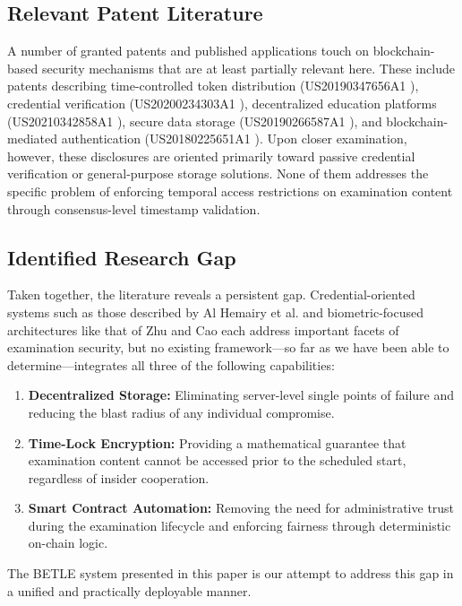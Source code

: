\documentclass[final,5p,times]{elsarticle}
\begin{document}
\subsection{Relevant Patent Literature}
A number of granted patents and published applications touch on blockchain-based security mechanisms that are at least partially relevant here. These include patents describing time-controlled token distribution \newline(US20190347656A1 \cite{us20190347656a1}), credential verification \newline(US20200234303A1 \cite{us20200234303a1}), decentralized education platforms (US20210342858A1 \cite{us20210342858a1}), secure data storage (US20190266587A1 \cite{us20190266587a1}), and blockchain-mediated authentication (US20180225651A1 \cite{us20180225651a1}). Upon closer examination, however, these disclosures are oriented primarily toward passive credential verification or general-purpose storage solutions. None of them addresses the specific problem of enforcing temporal access restrictions on examination content through consensus-level timestamp validation.

\subsection{Identified Research Gap}
Taken together, the literature reveals a persistent gap. Credential-oriented systems such as those described by Al Hemairy et al. \cite{AlHemairy2024} and biometric-focused architectures like that of Zhu and Cao \cite{zhu2021secure} each address important facets of examination security, but no existing framework—so far as we have been able to determine—integrates all three of the following capabilities:
\begin{enumerate}
    \item \textbf{Decentralized Storage:} Eliminating server-level single points of failure and reducing the blast radius of any individual compromise.
    \item \textbf{Time-Lock Encryption:} Providing a mathematical guarantee that examination content cannot be accessed prior to the scheduled start, regardless of insider cooperation.
    \item \textbf{Smart Contract Automation:} Removing the need for administrative trust during the examination lifecycle and enforcing fairness through deterministic on-chain logic.
\end{enumerate}
The BETLE system presented in this paper is our attempt to address this gap in a unified and practically deployable manner.
\end{document}
